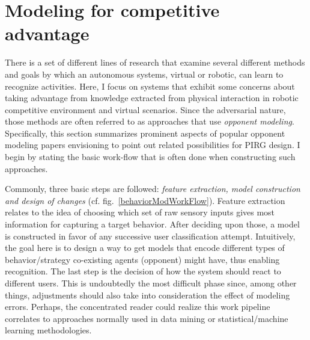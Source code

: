 \section{Modeling for competitive advantage}\label{compadvantage}
There is a set of different lines of research that examine several different methods and goals by which an autonomous systems, virtual or robotic, can learn to recognize activities. Here, I focus on systems that exhibit some concerns about taking advantage from knowledge extracted from physical interaction in robotic competitive environment and virtual scenarios. Since the adversarial nature, those methods are often referred to as approaches that use \textit{opponent modeling}.  Specifically, this section summarizes prominent aspects of popular opponent modeling papers envisioning to point out related possibilities for PIRG design. I begin by stating the basic work-flow that is often done when constructing such approaches. 

Commonly, three basic steps are followed: \textit{feature extraction, model construction and design of changes} (cf. fig.~\ref{behaviorModWorkFlow}). Feature extraction relates to the idea of choosing which set of raw sensory inputs gives most information for capturing a target behavior. After deciding upon those, a model is constructed in favor of any successive user classification attempt. Intuitively, the goal here is to design a way to get models that encode different types of behavior/strategy co-existing agents (opponent) might have, thus enabling recognition. The last step is the decision of how the system should react to different users. This is undoubtedly the most difficult phase since, among other things, adjustments should also take into consideration the effect of modeling errors. Perhaps, the concentrated reader could realize this work pipeline correlates to approaches normally used in data mining or statistical/machine learning methodologies.

